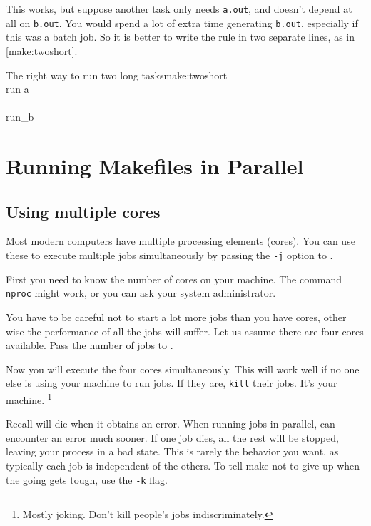 This works, but suppose another task only needs \texttt{a.out}, and doesn't depend at all on \texttt{b.out}. You would spend a lot of extra time generating \texttt{b.out}, especially if this was a batch job. So it is better to write the rule in two separate lines, as in \autoref{make:twoshort}.

\begin{make}{The right way to run two long tasks}{make:twoshort}
	 \\
	\tab run a \\
	
	 \\
	\tab run_b
\end{make}

\section{Running Makefiles in Parallel}
\label{sec:gridengine}
\subsection{Using multiple cores}

Most modern computers have multiple processing elements (cores). You can use these to execute multiple jobs simultaneously by passing the \texttt{-j} option to \maken.

First you need to know the number of cores on your machine. The command \texttt{nproc} might work, or you can ask your system administrator.

You have to be careful not to start a lot more jobs than you have cores, other wise the performance of all the jobs will suffer. Let us assume there are four cores available. Pass the number of jobs to \maken. 

Now you will execute the four cores simultaneously. This will work well if no one else is using your machine to run jobs. If they are, \texttt{kill} their jobs. It's your machine. \footnote{Mostly joking. Don't kill people's jobs indiscriminately.}

Recall \maken{} will die when it obtains an error. When running jobs in parallel, \maken{} can encounter an error much sooner. If one job dies, all the rest will be stopped, leaving your process in a bad state. This is rarely the behavior you want, as typically each job is independent of the others. To tell make not to give up when the going gets tough, use the \texttt{-k} flag.


